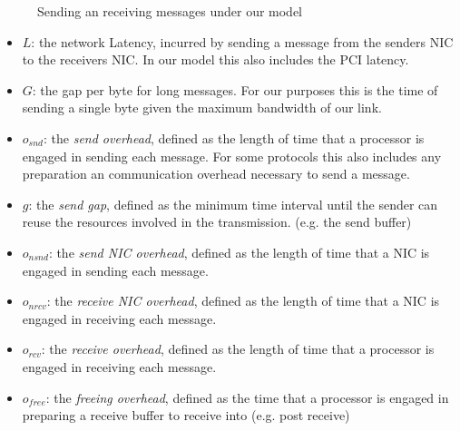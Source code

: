\begin{figure}[!htp]
\begin{center}
\end{center}
\caption{Sending an receiving messages under our model}
\label{fig:model-base}
\end{figure}




\begin{itemize}
  \item $L$: the network Latency, incurred by sending a message from the senders NIC to the receivers NIC. In our model 
    this also includes the PCI latency.
  \item $G$: the gap per byte for long messages. For our purposes this is the time of sending a single byte given the 
    maximum bandwidth of our link.
  \item $o_{snd}$: the \emph{send overhead}, defined as the length of time that a processor is engaged in sending each message.
    For some protocols this also includes any preparation an communication overhead necessary to send a message.
  \item $g$: the \emph{send gap}, defined as the minimum time interval until the sender can reuse the resources involved in 
    the transmission. (e.g. the send buffer) 
  \item $o_{nsnd}$: the \emph{send NIC overhead}, defined as the length of time that a NIC is engaged in sending each message.
  \item $o_{nrcv}$: the \emph{receive NIC overhead}, defined as the length of time that a NIC is engaged in receiving each message.
  \item $o_{rcv}$: the \emph{receive overhead}, defined as the length of time that a processor is engaged in receiving each message.
  \item $o_{free}$: the \emph{freeing overhead}, defined as the time that a processor is engaged in preparing a receive buffer
    to receive into (e.g. post receive)
\end{itemize}

